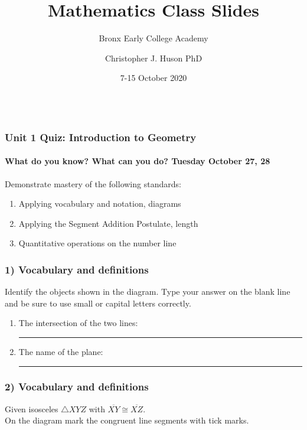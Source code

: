 \documentclass{beamer}
\title{Mathematics Class Slides}
\subtitle{Bronx Early College Academy}
\author{Christopher J. Huson PhD}
\date{7-15 October 2020}
\begin{document}
\section[Outline]{}


\frame
{
  \frametitle{\\Unit 1 Quiz: Introduction to Geometry}
  \framesubtitle{What do you know? What can you do?  \hfill \alert{Tuesday October 27, 28}} 
    Demonstrate mastery of the following standards:
    \begin{enumerate}
      \item Applying vocabulary and notation, diagrams
      \item Applying the Segment Addition Postulate, length
      \item Quantitative operations on the number line
    \end{enumerate}

}

\frame
  {
    \frametitle{1) Vocabulary and definitions}
    Identify the objects shown in the diagram. Type your answer on the blank line and be sure to use small or capital letters correctly.
    \begin{enumerate} \vspace{0.5cm}
      \item The intersection of the two lines:  \rule{3cm}{0.15mm} \bigskip
      \item The name of the plane:  \rule{3cm}{0.15mm} \bigskip
      \end{enumerate}
      \begin{center}
    \end{center}
  }

  \frame
  {
    \frametitle{2) Vocabulary and definitions}
    Given isosceles $\triangle XYZ$ with $\overline{XY} \cong \overline{XZ}$.\\[0.5cm]
    On the diagram mark the congruent line segments with tick marks. \vspace{1cm}
    \begin{center}
    \end{center}
  }
\end{document}
